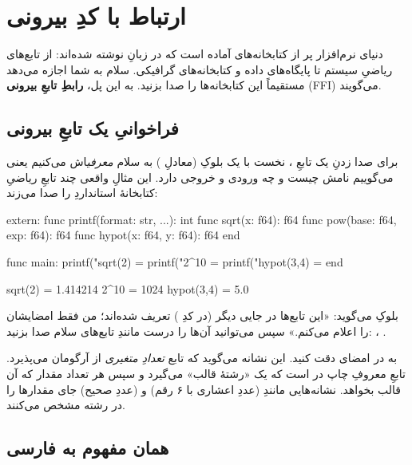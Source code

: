 \chapter{ارتباط با کدِ بیرونی}%
\label{ch:ffi}

دنیای نرم‌افزار پر از کتابخانه‌های آماده است که در زبانِ  نوشته شده‌اند:
از تابع‌های ریاضیِ سیستم تا پایگاه‌های داده و کتابخانه‌های گرافیکی. سلام به شما
اجازه می‌دهد مستقیماً این کتابخانه‌ها را صدا بزنید. به این پل، \textbf{رابطِ
تابعِ بیرونی} (FFI) می‌گویند.

\section{فراخوانیِ یک تابعِ بیرونی}

برای صدا زدنِ یک تابعِ ، نخست با یک بلوکِ  (معادلِ
) به سلام \emph{معرفی}اش می‌کنیم یعنی می‌گوییم نامش چیست و چه
ورودی و خروجی دارد. این مثالِ واقعی چند تابعِ ریاضیِ کتابخانهٔ استانداردِ
 را صدا می‌زند:

\begin{salamen}
extern:
    func printf(format: str, ...): int
    func sqrt(x: f64): f64
    func pow(base: f64, exp: f64): f64
    func hypot(x: f64, y: f64): f64
end

func main:
    printf("sqrt(2)    = %
    printf("2^10       = %
    printf("hypot(3,4) = %
end
\end{salamen}

\begin{progout}
sqrt(2)    = 1.414214
2^10       = 1024
hypot(3,4) = 5.0
\end{progout}

بلوکِ  می‌گوید: «این تابع‌ها در جایی دیگر (در کدِ )
تعریف شده‌اند؛ من فقط امضایشان را اعلام می‌کنم.» سپس می‌توانید آن‌ها را درست
مانندِ تابع‌های سلام صدا بزنید: ، .

\begin{note}
به  در امضای  دقت کنید. این نشانه می‌گوید که تابع
\emph{تعدادِ متغیری} از آرگومان می‌پذیرد.  تابعِ معروفِ چاپ در
 است که یک «رشتهٔ قالب» می‌گیرد و سپس هر تعداد مقدار که آن قالب بخواهد.
نشانه‌هایی مانندِ  (عددِ اعشاری با ۶ رقم) و
 (عددِ صحیح) جای مقدارها را در رشته مشخص می‌کنند.
\end{note}

\section{همان مفهوم به فارسی}

